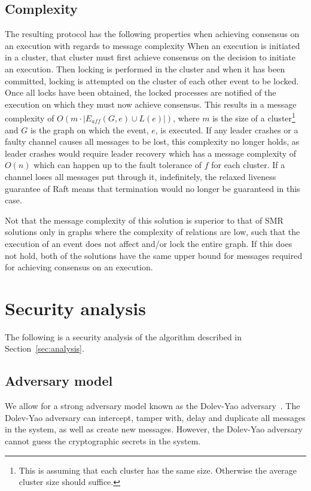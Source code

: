 \documentclass{article}
\begin{document}
	\subsection{Complexity}

	The resulting protocol has the following properties when achieving consensus on an execution with regards to message complexity
	When an execution is initiated in a cluster, that cluster must first achieve consensus on the decision to initiate an execution.
	Then locking is performed in the cluster and when it has been committed, locking is attempted on the cluster of each other event to be locked.
	Once all locks have been obtained, the locked processes are notified of the execution on which they must now achieve consensus.
	This results in a message complexity of $O(m\cdot |E_{aff}(G, e) \cup L(e)|)$, where $m$ is the size of a cluster\footnote{This is assuming that each cluster has the same size. Otherwise the average cluster size should suffice.} and $G$ is the graph on which the event, $e$, is executed.
	If any leader crashes or a faulty channel causes all messages to be lost, this complexity no longer holds, as leader crashes would require leader recovery which has a message complexity of $O(n)$ which can happen up to the fault tolerance of $f$ for each cluster.
	If a channel loses all messages put through it, indefinitely, the relaxed liveness guarantee of Raft means that termination would no longer be guaranteed in this case.

	Not that the message complexity of this solution is superior to that of SMR solutions only in graphs where the complexity of relations are low, such that the execution of an event does not affect and/or lock the entire graph.
	If this does not hold, both of the solutions have the same upper bound for messages required for achieving consensus on an execution.

	\section{Security analysis}
    \label{sec:security-analysis}

	The following is a security analysis of the algorithm described in Section~\ref{sec:analysis}.

		\subsection{Adversary model}

		We allow for a strong adversary model known as the Dolev-Yao adversary~\cite{dolev_security_1983}.
		The Dolev-Yao adversary can intercept, tamper with, delay and duplicate all messages in the system, as well as create new messages.
		However, the Dolev-Yao adversary cannot guess the cryptographic secrets in the system.
\end{document}
